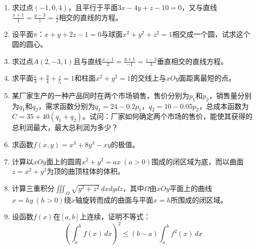 \documentclass[quiet]{ctexart}
\begin{document}
\begin{enumerate}
    \item[15.] 求过点$(-1,0,4)$，且平行于平面$3x - 4y + z - 10 = 0$，又与直线$\frac{x + 1}{1} = \frac{y - 3}{1} = \frac{z}{2}$相交的直线的方程。

    \item[16.] 设平面$\pi$：$x + y + 2z - 1 = 0$与球面$x^{2} + y^{2} + z^{2} = 1$相交成一个圆，试求这个圆的圆心。

    \item[17.] 求过点$A(2, -3,1)$且与直线$\frac{x - 1}{2} = \frac{y + 1}{-1} = \frac{z - 3}{3}$垂直相交的直线方程。

    \item[18.] 求平面$\frac{x}{3} + \frac{y}{4} + \frac{z}{5} = 1$和柱面$x^{2} + y^{2} = 1$的交线上与$xOy$面距离最短的点。

    \item[19.] 某厂家生产的一种产品同时在两个市场销售，售价分别为$p_1$和$p_2$，销售量分别为$q_1$和$q_2$，需求函数分别为$q_1 = 24 - 0.2p_1$，$q_2 = 10 - 0.05p_2$，总成本函数为$C = 35 + 40(q_1 + q_2)$。试问：厂家如何确定两个市场的售价，能使其获得的总利润最大，最大总利润为多少？

    \item[20.] 求函数$f(x,y) = x^{3} + 8y^{3} - xy$的极值。

    \item[21.] 计算以$xOy$面上的圆周$x^{2} + y^{2} = ax\ (a > 0)$围成的闭区域为底，而以曲面$z = x^{2} + y^{2}$为顶的曲顶柱体的体积。

    \item[22.] 计算三重积分$\iiint_{\Omega}\sqrt{y^{2} + z^{2}}\,dxdydz$，其中$\Omega$由$xOy$平面上的曲线$x = hy\ (h > 0)$绕$x$轴旋转而成的曲面与平面$x = h$所围成的闭区域。

    \item[23.] 设函数$f(x)$在$[a,b]$上连续，证明不等式：
    \[
    \left( \int_{a}^{b}f(x)\,dx \right)^{2} \leq (b - a)\int_{a}^{b}f^{2}(x)\,dx
    \]
\end{enumerate}
\end{document}
